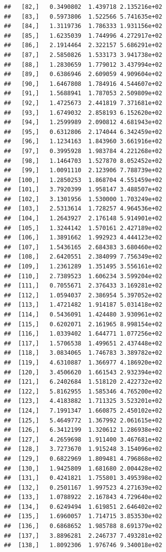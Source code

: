 \documentclass[article]{jss}\usepackage[]{graphicx}\usepackage[]{xcolor}
\makeatletter
\newenvironment{kframe}{%
 \def\at@end@of@kframe{}%
 \ifinner\ifhmode%
  \def\at@end@of@kframe{\end{minipage}}%
  \begin{minipage}{\columnwidth}%
 \fi\fi%
 \def\FrameCommand##1{\hskip\@totalleftmargin \hskip-\fboxsep
 \colorbox{shadecolor}{##1}\hskip-\fboxsep
     \hskip-\linewidth \hskip-\@totalleftmargin \hskip\columnwidth}%
 \MakeFramed {\advance\hsize-\width
   \@totalleftmargin\z@ \linewidth\hsize
   \@setminipage}}%
 {\par\unskip\endMakeFramed%
 \at@end@of@kframe}
\newenvironment{knitrout}{}{} %
\makeatother
\begin{document}
\begin{knitrout}
\begin{kframe}
\begin{verbatim}
##   [82,]   0.3490802  1.439718 2.135216e+02
##   [83,]   0.5973806  1.522566 5.741635e+02
##   [84,]   1.3119736  1.786333 1.931156e+02
##   [85,]   1.6235039  1.744996 4.272917e+02
##   [86,]   2.1914464  2.322157 5.686291e+02
##   [87,]   2.5850826  1.533173 3.941738e+02
##   [88,]   1.2830659  1.779012 3.437994e+02
##   [89,]   0.6386946  2.609059 4.909604e+02
##   [90,]   1.6467808  1.784916 4.544607e+02
##   [91,]   1.5688941  1.787053 2.509809e+02
##   [92,]   1.4725673  2.441819 7.371681e+02
##   [93,]   1.6749032  2.858193 6.152620e+02
##   [94,]   1.2599989  2.090812 4.681943e+02
##   [95,]   0.6312806  2.174044 6.342459e+02
##   [96,]   1.1234163  1.843960 3.661916e+02
##   [97,]   0.3995928  1.983784 4.221268e+02
##   [98,]   1.1464703  1.527870 8.052452e+02
##   [99,]   1.0091110  2.123906 7.788739e+02
##  [100,]   1.2850253  1.868704 4.551459e+02
##  [101,]   3.7920399  1.958147 3.488507e+02
##  [102,]   3.1301956  1.530000 1.703249e+02
##  [103,]   2.5313614  1.728257 4.964536e+02
##  [104,]   1.2643927  2.176148 5.914901e+02
##  [105,]   1.3244142  1.570161 2.427189e+02
##  [106,]   1.3891662  1.992923 4.444123e+02
##  [107,]   1.5436165  2.684383 3.680460e+02
##  [108,]   2.6420551  2.384099 7.756349e+02
##  [109,]   1.2361289  1.351495 3.556161e+02
##  [110,]   2.7389523  1.606234 3.599204e+02
##  [111,]   0.7055671  2.376433 3.169281e+02
##  [112,]   1.0594037  2.386954 5.397052e+02
##  [113,]   1.4721482  1.914187 5.031418e+02
##  [114,]   0.5436091  1.424480 3.930961e+02
##  [115,]   0.6202071  2.161965 8.998154e+02
##  [116,]   1.0339402  1.644771 1.077256e+02
##  [117,]   1.5706538  1.499651 2.437448e+02
##  [118,]   3.0834065  1.746783 3.389782e+02
##  [119,]   4.6310887  1.366977 4.186920e+02
##  [120,]   3.4506620  1.661543 2.932394e+02
##  [121,]   6.2402684  1.518120 2.422732e+02
##  [122,]   5.8162955  1.585346 4.765200e+02
##  [123,]   4.4183882  1.711325 3.523201e+02
##  [124,]   7.1991347  1.660875 2.450102e+02
##  [125,]   5.4649772  1.367992 2.061615e+02
##  [126,]   6.3412199  1.320612 1.286938e+02
##  [127,]   4.2659698  1.911400 3.467681e+02
##  [128,]   3.7273670  1.915248 3.154096e+02
##  [129,]   0.6822969  1.809481 4.796868e+02
##  [130,]   1.9425809  1.681680 2.004428e+02
##  [131,]   0.4241821  1.755801 3.495398e+02
##  [132,]   0.2501167  1.997523 4.271639e+02
##  [133,]   1.0788922  2.167843 4.729640e+02
##  [134,]   0.6249494  1.619851 2.646402e+02
##  [135,]   1.6960057  1.714715 3.853530e+02
##  [136,]   0.6868652  1.985788 8.691379e+02
##  [137,]   3.8896281  2.246737 7.493281e+02
##  [138,]   1.8092306  1.976746 9.340018e+02

\end{verbatim}
\end{kframe}
\end{knitrout}
\end{document}
